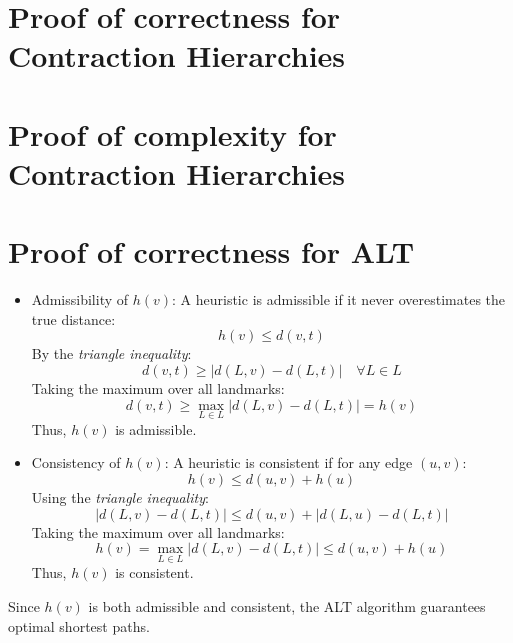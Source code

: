 \begin{appendices}
\section{Proof of correctness for Contraction Hierarchies}\label{appendix:contraction:correctness}

\section{Proof of complexity for Contraction Hierarchies}\label{appendix:contraction:complexity}

\section{Proof of correctness for ALT}\label{appendix:ALT:correctness}

\begin{itemize}
	\item Admissibility of $h(v)$: A heuristic is admissible if it never overestimates the true distance:  
	\begin{equation*} h(v) \leq d(v, t) \end{equation*}
	By the \textit{triangle inequality}: \begin{equation*} d(v, t) \geq |d(L, v) - d(L, t)| \quad \forall L \in L \end{equation*}
	Taking the maximum over all landmarks:
	\begin{equation*}
		d(v, t) \geq \max_{L \in \textit{L}} \left| d(L, v) - d(L, t) \right| = h(v)
	\end{equation*}
	Thus, $ h(v) $ is admissible.
	\item Consistency of $h(v)$: A heuristic is consistent if for any edge $ (u, v) $:
	\begin{equation*}
		h(v) \leq d(u, v) + h(u)
	\end{equation*}
	Using the \textit{triangle inequality}:
	\begin{equation*} 
		|d(L, v) - d(L, t)| \leq d(u, v) + |d(L, u) - d(L, t)| 
	\end{equation*}
	Taking the maximum over all landmarks:
	\begin{equation*}
		h(v) = \max_{L \in \textit{L}} \left| d(L, v) - d(L, t) \right| \leq d(u, v) + h(u)
	\end{equation*}
	Thus, $ h(v) $ is consistent.
\end{itemize}
Since $ h(v) $ is both admissible and consistent, the ALT algorithm guarantees optimal shortest paths.


\end{appendices}
